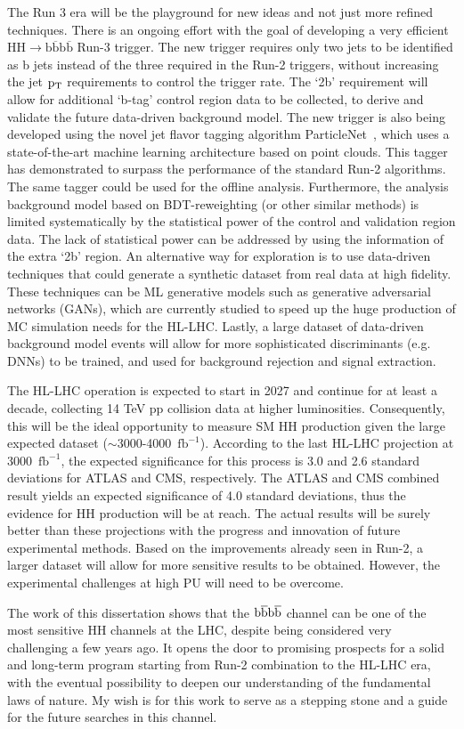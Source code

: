 The Run 3 era will be the playground for new ideas and not just more refined techniques. There is an ongoing effort with the goal of developing a very efficient $\mathrm{HH\rightarrow b\overline{b}b\overline{b}}$ Run-3 trigger. The new trigger requires only two jets to be identified as b jets instead of the three required in the Run-2 triggers, without increasing the jet $\mathrm{p_{T}}$ requirements to control the trigger rate. The `2b' requirement will allow for additional `b-tag' control region data to be collected, to derive and validate the future data-driven background model. The new trigger is also being developed using the novel jet flavor tagging algorithm ParticleNet~\cite{Qu:2019gqs}, which uses a state-of-the-art machine learning architecture based on point clouds. This tagger has demonstrated to surpass the performance of the standard Run-2 algorithms. The same tagger could be used for the offline analysis. Furthermore, the analysis background model based on BDT-reweighting (or other similar methods) is limited systematically by the statistical power of the control and validation region data. The lack of statistical power can be addressed by using the information of the extra `2b' region. An alternative way for exploration is to use data-driven techniques that could generate a synthetic dataset from real data at high fidelity. These techniques can be ML generative models such as generative adversarial networks (GANs), which are currently studied to speed up the huge production of MC simulation needs for the HL-LHC. Lastly, a large dataset of data-driven background model events will allow for more sophisticated discriminants (e.g. DNNs) to be trained, and used for background rejection and signal extraction. 

The HL-LHC operation is expected to start in 2027 and continue for at least a decade, collecting 14 TeV pp collision data at higher luminosities. Consequently, this will be the ideal opportunity to measure SM HH production given the large expected dataset ($\sim$3000-4000~$\mathrm{fb^{-1}}$). According to the last HL-LHC projection at 3000~$\mathrm{fb^{-1}}$, the expected significance for this process is 3.0 and 2.6 standard deviations for ATLAS and CMS, respectively. The ATLAS and CMS combined result yields an expected significance of 4.0 standard deviations, thus the evidence for HH production will be at reach. The actual results will be surely better than these projections with the progress and innovation of future experimental methods. Based on the improvements already seen in Run-2, a larger dataset will allow for more sensitive results to be obtained. However, the experimental challenges at high PU will need to be overcome. 

The work of this dissertation shows that the $\mathrm{ b\overline{b}b\overline{b} }$ channel can be one of the most sensitive HH channels at the LHC, despite being considered very challenging a few years ago. It opens the door to promising prospects for a solid and long-term program starting from Run-2 combination to the HL-LHC era, with the eventual possibility to deepen our understanding of the fundamental laws of nature. My wish is for this work to serve as a stepping stone and a guide for the future searches in this channel.